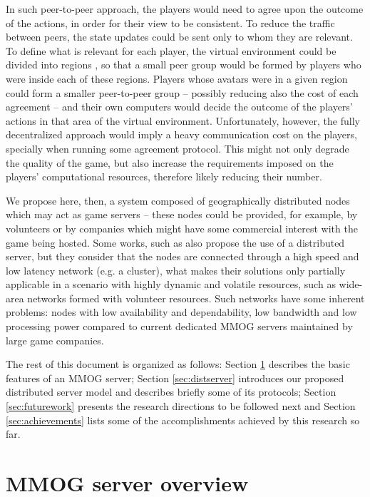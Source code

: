 \documentclass[]{usiinfprospectus}
\begin{document}
In such peer-to-peer approach, the players would need to agree upon the outcome of the actions, in order for their view to be consistent. To reduce the traffic between peers, the state updates could be sent only to whom they are relevant. To define what is relevant for each player, the virtual environment could be divided into regions \cite{schiele2007rpp}, so that a small peer group would be formed by players who were inside each of these regions. Players whose avatars were in a given region could form a smaller peer-to-peer group -- possibly reducing also the cost of each agreement -- and their own computers would decide the outcome of the players' actions in that area of the virtual environment. Unfortunately, however, the fully decentralized approach would imply a heavy communication cost on the players, specially when running some agreement protocol. This might not only degrade the quality of the game, but also increase the requirements imposed on the players' computational resources, therefore likely reducing their number.

We propose here, then, a system composed of geographically distributed nodes which may act as game servers -- these nodes could be provided, for example, by volunteers or by companies which might have some commercial interest with the game being hosted. Some works, such as \cite{assiotis2006dam,ng2002msa, chertov2006olb, lee2003sdl} also propose the use of a distributed server, but they consider that the nodes are connected through a high speed and low latency network (e.g. a cluster), what makes their solutions only partially applicable in a scenario with highly dynamic and volatile resources, such as wide-area networks formed with volunteer resources. Such networks have some inherent problems: nodes with low availability and dependability, low bandwidth and low processing power compared to current dedicated MMOG servers maintained by large game companies.

The rest of this document is organized as follows: Section \ref{sec:mmogserver} describes the basic features of an MMOG server; Section \ref{sec:distserver} introduces our proposed distributed server model and describes briefly some of its protocols; Section \ref{sec:futurework} presents the research directions to be followed next and Section \ref{sec:achievements} lists some of the accomplishments achieved by this research so far.

\section{MMOG server overview} \label{sec:mmogserver}
\end{document}
